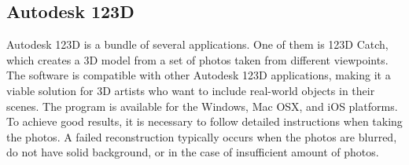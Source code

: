 

\subsection{Autodesk 123D}

Autodesk 123D is a bundle of several applications. 
One of them is 123D Catch, which creates a 3D model from a set of photos taken from different viewpoints.
The software is compatible with other Autodesk 123D applications, making it a viable solution for 3D artists who want to include real-world objects in their scenes.
The program is available for the Windows, Mac OSX, and iOS platforms.
To achieve good results, it is necessary to follow detailed instructions when taking the photos. 
A failed reconstruction typically occurs when the photos are blurred, do not have solid background, or in the case of insufficient amount of photos. %



